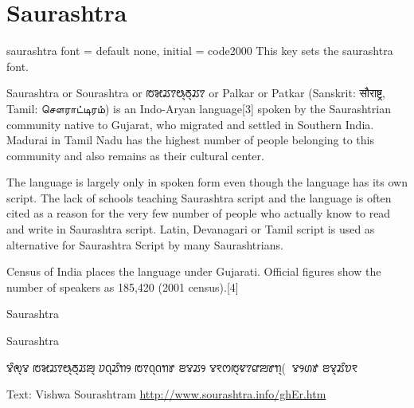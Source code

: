 \section{Saurashtra}
\label{s:saurashtra}

\newfontfamily{}
\def\test{}
\cxset{saurashtra font/.code=\test}

\begin{docKey}[phd]{saurashtra font}{ = } {default none, initial = code2000}
  This key sets the saurashtra font.
\end{docKey}

Saurashtra or Sourashtra or {\saurashtra ꢱꣃꢬꢵꢰ꣄ꢜ꣄ꢬꢵ} or Palkar or Patkar (Sanskrit: सौराष्ट्र, Tamil: சௌராட்டிரம்) is an Indo-Aryan language[3] spoken by the Saurashtrian community native to Gujarat, who migrated and settled in Southern India. Madurai in Tamil Nadu has the highest number of people belonging to this community and also remains as their cultural center.

The language is largely only in spoken form even though the language has its own script. The lack of schools teaching Saurashtra script and the language is often cited as a reason for the very few number of people who actually know to read and write in Saurashtra script. Latin, Devanagari or Tamil script is used as alternative for Saurashtra Script by many Saurashtrians.

Census of India places the language under Gujarati. Official figures show the number of speakers as 185,420 (2001 census).[4]


\begin{scriptexample}[]{Saurashtra}
\end{scriptexample}


\begin{scriptexample}[]{Saurashtra}
\bgroup
\saurashtra

ꢮꢶꢯ꣄ꢮ ꢱꣃꢬꢵꢰ꣄ꢜ꣄ꢬꢪ꣄ ꢦꢡ꣄ꢬꢶꢒꢾ ꢱꢵꢡ꣄ꢡꢒꢸ ꢂꢮꢬꢾ
ꢮꣁꢭꢱ꣄ꢢꢵꢥꢪꢸꢒ꣄(ꣀꢵꢮꢾꢔꢹ ꢂꢮ꣄ꢬꢶꢫꣁ


\arial

Text: Vishwa Sourashtram \url{http://www.sourashtra.info/ghEr.htm}
\egroup
\end{scriptexample}


